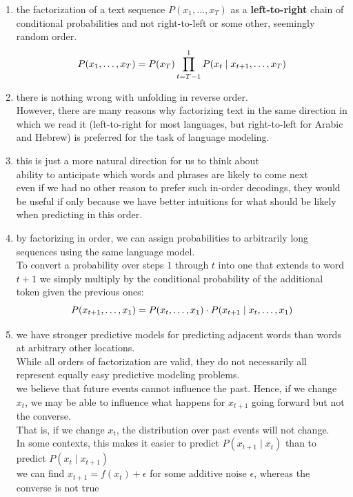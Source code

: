 \begin{enumerate}[itemsep=0.15cm]
    \item the factorization of a text sequence $P(x_1, \ldots, x_T)$ as a \textbf{left-to-right} chain of conditional probabilities and not right-to-left or some other, seemingly random order.
    \[
        \hfill
        P(x_1, \ldots, x_T) = P(x_T) \prod_{t=T-1}^1 P(x_t \mid x_{t+1}, \ldots, x_T)
        \hfill
    \]

    \item there is nothing wrong with unfolding in reverse order.\\
    However, there are many reasons why factorizing text in the same direction in which we read it (left-to-right for most languages, but right-to-left for Arabic and Hebrew) is preferred for the task of language modeling.

    \item this is just a more natural direction for us to think about\\
    ability to anticipate which words and phrases are likely to come next\\
    even if we had no other reason to prefer such in-order decodings, they would be useful if only because we have better intuitions for what should be likely when predicting in this order.

    \item by factorizing in order, we can assign probabilities to arbitrarily long sequences using the same language model.\\
    To convert a probability over steps $1$ through $t$ into one that extends to word $t+1$ we simply multiply by the conditional probability of the additional token given the previous ones: 
    \[
        \hfill
        P(x_{t+1}, \ldots, x_1) = P(x_{t}, \ldots, x_1) \cdot P(x_{t+1} \mid x_{t}, \ldots, x_1)
        \hfill
    \]

    \item we have stronger predictive models for predicting adjacent words than words at arbitrary other locations. \\
    While all orders of factorization are valid, they do not necessarily all represent equally easy predictive modeling problems.\\
    we believe that future events cannot influence the past. Hence, if we change $x_t$, we may be able to influence what happens for $x_{t+1}$ going forward but not the converse.\\
    That is, if we change $x_t$, the distribution over past events will not change.\\
    In some contexts, this makes it easier to predict $P(x_{t+1} \mid x_t)$ than to predict $P(x_t \mid x_{t+1})$\\
    we can find $x_{t+1} = f(x_t) + \epsilon$ for some additive noise $\epsilon$, whereas the converse is not true

    
\end{enumerate}




